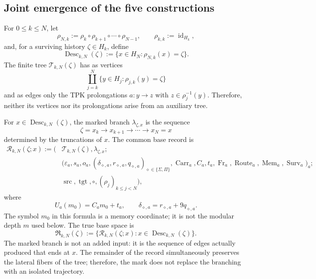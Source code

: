 \subsection{Joint emergence of the five constructions}
\label{sec:cinco-construcciones-continuo-ch}

For \(0\leq k\leq N\), let
\[
 \rho_{N,k}:=\rho_k\circ\rho_{k+1}\circ\cdots\circ\rho_{N-1},
 \qquad \rho_{k,k}:=\operatorname{id}_{H_k},
\]
and, for a surviving history \(\zeta\in H_k\), define
\[
 \operatorname{Desc}_{k,N}(\zeta)
 :=\{x\in H_N:\rho_{N,k}(x)=\zeta\}.
\]
The finite tree \(\mathscr T_{k,N}(\zeta)\) has as vertices
\[
 \coprod_{j=k}^{N}\{y\in H_j:\rho_{j,k}(y)=\zeta\}
\]
and as edges only the TPK prolongations
\(a:y\to z\) with \(z\in\rho_j^{-1}(y)\). Therefore, neither its vertices nor
its prolongations arise from an auxiliary tree.

For \(x\in\operatorname{Desc}_{k,N}(\zeta)\), the marked branch
\(\lambda_{\zeta,x}\) is the sequence
\[
 \zeta=x_k\longrightarrow x_{k+1}\longrightarrow\cdots
 \longrightarrow x_N=x
\]
determined by the truncations of \(x\). The common base record is
\[
\begin{aligned}
 \mathscr R_{k,N}(\zeta;x):=
 \bigl(&\mathscr T_{k,N}(\zeta),\lambda_{\zeta,x};\\
 &\bigl(\varepsilon_a,s_a,o_a,
   (\delta_{\diamond,a},r_{\diamond,a},q_{\diamond,a})
       _{\diamond\in\{\Sigma,\Pi\}},
   \operatorname{Carr}_a,C_a,t_a,\operatorname{Fr}_a,
   \operatorname{Route}_a,\operatorname{Mem}_a,
   \operatorname{Surv}_a\bigr)_a;\\
 &\operatorname{src},\operatorname{tgt},\circ,
   (\rho_j)_{k\leq j<N}\bigr),
\end{aligned}
\tag{C1}
\label{eq:base-comun-registros}
\]
where
\[
 U_a(m_0)=C_am_0+t_a,
 \qquad
 \delta_{\diamond,a}=r_{\diamond,a}+9q_{\diamond,a}.
\]
The symbol \(m_0\) in this formula is a memory coordinate; it is not the
modular depth \(m\) used below. The true base space is
\[
 \mathfrak R_{k,N}(\zeta)
 :=\{\mathscr R_{k,N}(\zeta;x):
       x\in\operatorname{Desc}_{k,N}(\zeta)\}.
\]
The marked branch is not an added input: it is the sequence of edges
actually produced that ends at \(x\). The remainder of the record simultaneously
preserves the lateral fibers of the tree; therefore, the mark does not replace
the branching with an isolated trajectory.


